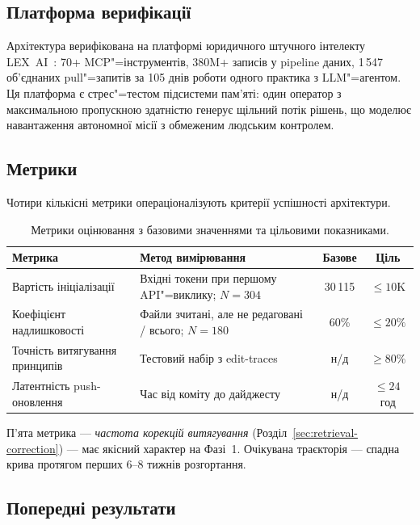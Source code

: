 \documentclass[11pt]{article}
\begin{document}
\subsection{Платформа верифікації}
\label{sec:platform}

Архітектура верифікована на платформі юридичного штучного інтелекту LEX~AI~\citep{ovcharov2026edittrace}: 70+ MCP"=інструментів, 380M+ записів у pipeline даних, 1\,547 об'єднаних pull"=запитів за 105 днів роботи одного практика з LLM"=агентом.
Ця платформа є стрес"=тестом підсистеми пам'яті: один оператор з максимальною пропускною здатністю генерує щільний потік рішень, що моделює навантаження автономної місії з обмеженим людським контролем.

\subsection{Метрики}
\label{sec:metrics}

Чотири кількісні метрики операціоналізують критерії успішності архітектури.

\begin{table}[ht]
\centering
\small
\begin{tabularx}{\textwidth}{@{}l X c c@{}}
\toprule
\textbf{Метрика} & \textbf{Метод вимірювання} & \textbf{Базове} & \textbf{Ціль} \\
\midrule
Вартість ініціалізації &
  Вхідні токени при першому API"=виклику; $N{=}304$ &
  30\,115 & ${\leq}10$K \\
\addlinespace
Коефіцієнт надлишковості &
  Файли зчитані, але не редаговані / всього; $N{=}180$ &
  60\% & ${\leq}20\%$ \\
\addlinespace
Точність витягування принципів &
  Тестовий набір з edit-traces &
  н/д & ${\geq}80\%$ \\
\addlinespace
Латентність push-оновлення &
  Час від коміту до дайджесту &
  н/д & ${\leq}24$\,год \\
\bottomrule
\end{tabularx}
\caption{Метрики оцінювання з базовими значеннями та цільовими показниками.}
\label{tab:metrics}
\end{table}

П'ята метрика --- \emph{частота корекцій витягування} (Розділ~\ref{sec:retrieval-correction}) --- має якісний характер на Фазі~1.
Очікувана траєкторія --- спадна крива протягом перших 6--8 тижнів розгортання.

\subsection{Попередні результати}
\label{sec:preliminary}
\end{document}
